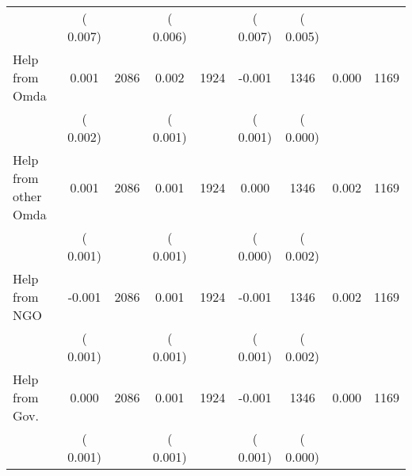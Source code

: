 \begin{tabular}{l*{8}{c}}
                       &       (       0.007)            &                               &       (       0.006)            &                               &       (       0.007)            &       (       0.005) &                  \\
Help from Omda        &              0.001      &       2086       &              0.002      &       1924       &             -0.001      &       1346  &        0.000 &       1169       \\
                       &       (       0.002)            &                               &       (       0.001)            &                               &       (       0.001)            &       (       0.000) &                  \\
Help from other Omda        &              0.001      &       2086       &              0.001      &       1924       &              0.000      &       1346  &        0.002 &       1169       \\
                       &       (       0.001)            &                               &       (       0.001)            &                               &       (       0.000)            &       (       0.002) &                  \\
Help from NGO        &             -0.001      &       2086       &              0.001      &       1924       &             -0.001      &       1346  &        0.002 &       1169       \\
                       &       (       0.001)            &                               &       (       0.001)            &                               &       (       0.001)            &       (       0.002) &                  \\
Help from Gov.        &              0.000      &       2086       &              0.001      &       1924       &             -0.001      &       1346  &        0.000 &       1169       \\
                       &       (       0.001)            &                               &       (       0.001)            &                               &       (       0.001)            &       (       0.000) &                  \\
\hline \end{tabular}